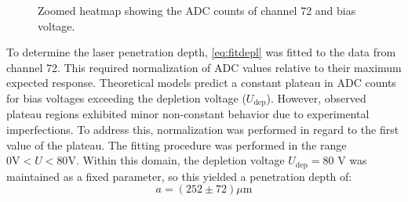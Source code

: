 \begin{figure}[H]
	\centering
	\caption{Zoomed heatmap showing the ADC counts of channel 72 and bias voltage.}
	\label{fig:smallvolt}
\end{figure}

To determine the laser penetration depth, \cref{eq:fitdepl} was fitted to the data from channel 72. This required normalization of ADC values relative to their maximum expected response. Theoretical models predict a constant plateau in ADC counts for bias voltages exceeding the depletion voltage ($U_{\text{dep}}$). However, observed plateau regions exhibited minor non-constant behavior due to experimental imperfections. To address this, normalization was performed in regard to the first value of the plateau. The fitting procedure was performed in the range $0  \text{V} < U < 80  \text{V}$. Within this domain, the depletion voltage $U_{\text{dep}} = 80$ V was maintained as a fixed parameter, so this yielded a penetration depth of:
\[
a = (252 \pm 72)  \mu\text{m}
\]

